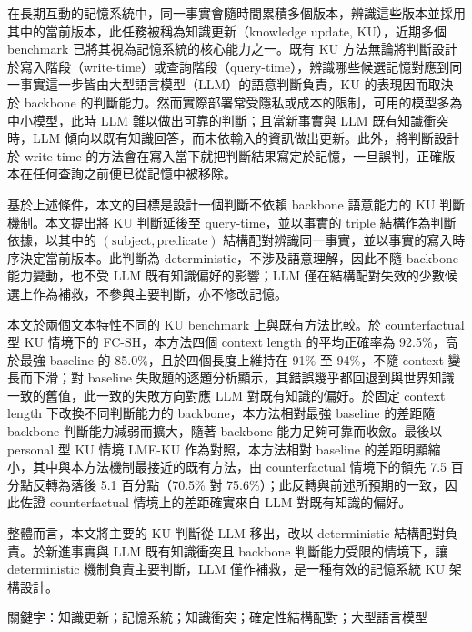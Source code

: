 
在長期互動的記憶系統中，同一事實會隨時間累積多個版本，辨識這些版本並採用其中的當前版本，此任務被稱為知識更新（knowledge update, KU），近期多個 benchmark 已將其視為記憶系統的核心能力之一。既有 KU 方法無論將判斷設計於寫入階段（write-time）或查詢階段（query-time），辨識哪些候選記憶對應到同一事實這一步皆由大型語言模型（LLM）的語意判斷負責，KU 的表現因而取決於 backbone 的判斷能力。然而實際部署常受隱私或成本的限制，可用的模型多為中小模型，此時 LLM 難以做出可靠的判斷；且當新事實與 LLM 既有知識衝突時，LLM 傾向以既有知識回答，而未依輸入的資訊做出更新。此外，將判斷設計於 write-time 的方法會在寫入當下就把判斷結果寫定於記憶，一旦誤判，正確版本在任何查詢之前便已從記憶中被移除。
 
基於上述條件，本文的目標是設計一個判斷不依賴 backbone 語意能力的 KU 判斷機制。本文提出將 KU 判斷延後至 query-time，並以事實的 triple 結構作為判斷依據，以其中的 $(\text{subject}, \text{predicate})$ 結構配對辨識同一事實，並以事實的寫入時序決定當前版本。此判斷為 deterministic，不涉及語意理解，因此不隨 backbone 能力變動，也不受 LLM 既有知識偏好的影響；LLM 僅在結構配對失效的少數候選上作為補救，不參與主要判斷，亦不修改記憶。
 
本文於兩個文本特性不同的 KU benchmark 上與既有方法比較。於 counterfactual 型 KU 情境下的 FC-SH，本方法四個 context length 的平均正確率為 92.5\%，高於最強 baseline 的 85.0\%，且於四個長度上維持在 91\% 至 94\%，不隨 context 變長而下滑；對 baseline 失敗題的逐題分析顯示，其錯誤幾乎都回退到與世界知識一致的舊值，此一致的失敗方向對應 LLM 對既有知識的偏好。於固定 context length 下改換不同判斷能力的 backbone，本方法相對最強 baseline 的差距隨 backbone 判斷能力減弱而擴大，隨著 backbone 能力足夠可靠而收斂。最後以 personal 型 KU 情境 LME-KU 作為對照，本方法相對 baseline 的差距明顯縮小，其中與本方法機制最接近的既有方法，由 counterfactual 情境下的領先 7.5 百分點反轉為落後 5.1 百分點（70.5\% 對 75.6\%）；此反轉與前述所預期的一致，因此佐證 counterfactual 情境上的差距確實來自 LLM 對既有知識的偏好。
 
整體而言，本文將主要的 KU 判斷從 LLM 移出，改以 deterministic 結構配對負責。於新進事實與 LLM 既有知識衝突且 backbone 判斷能力受限的情境下，讓 deterministic 機制負責主要判斷，LLM 僅作補救，是一種有效的記憶系統 KU 架構設計。

關鍵字：知識更新；記憶系統；知識衝突；確定性結構配對；大型語言模型